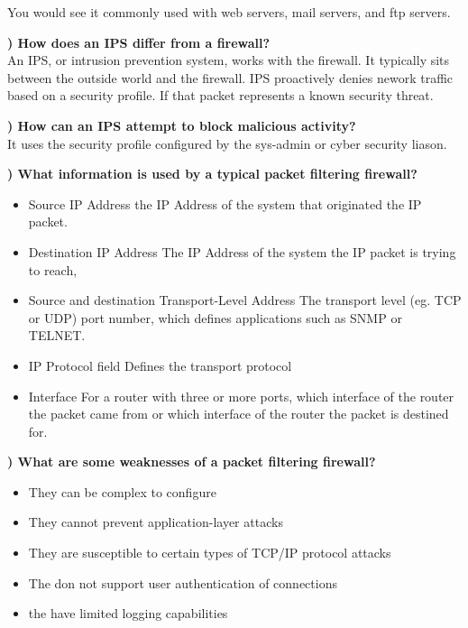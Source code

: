 \documentclass{report}
\newcommand{\mysubsection}[2]{\textbf{\romannumeral #1) #2}}
\begin{document}
You would see it commonly used with web servers, mail servers, and ftp servers.


\noindent\mysubsection{5}{How does an IPS differ from a firewall?}
\\An IPS, or intrusion prevention system, works with the firewall. It typically
sits between the outside world and the firewall. IPS proactively denies nework
traffic based on a security profile. If that packet represents a known security
threat.


\noindent\mysubsection{6}{How can an IPS attempt to block malicious activity?}
\\It uses the security profile configured by the sys-admin or cyber security
liason.


\noindent\mysubsection{7}{What information is used by a typical packet filtering firewall?}
\begin{itemize}
  \item{Source IP Address} the IP Address of the system that originated the IP
    packet.
  \item{Destination IP Address} The IP Address of the system the IP packet is
    trying to reach,
  \item{Source and destination Transport-Level Address} The transport level
    (eg. TCP or UDP) port number, which defines applications such as SNMP or
    TELNET. 
  \item{IP Protocol field} Defines the transport protocol
  \item{Interface} For a router with three or more ports, which interface of
    the router the packet came from or which interface of the router the packet
    is destined for.
\end{itemize}


\noindent\mysubsection{8}{What are some weaknesses of a packet filtering firewall?}
\begin{itemize}
  \item{They can be complex to configure} 
  \item{They cannot prevent application-layer attacks} 
  \item{They are susceptible to certain types of TCP/IP protocol attacks} 
  \item{The don not support user authentication of connections} 
  \item{the have limited logging capabilities} 
\end{itemize}
\end{document}
